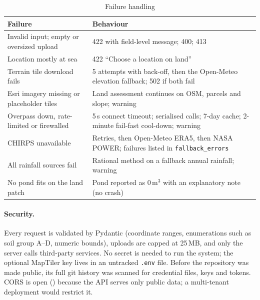 \documentclass[manuscript,screen,review]{acmart}
\newcommand{\code}[1]{\texttt{\small #1}}
\begin{document}
\begin{table}[h]
  \caption{Failure handling}
  \label{tab:failures}
  \small
  \begin{tabularx}{\linewidth}{@{}P{3.6cm}Y@{}}
    \toprule
    Failure & Behaviour \\
    \midrule
    Invalid input; empty or oversized upload & 422 with field-level message; 400; 413 \\
    Location mostly at sea & 422 ``Choose a location on land'' \\
    Terrain tile download fails & 5 attempts with back-off, then the Open-Meteo elevation fallback; 502 if both fail \\
    Esri imagery missing or placeholder tiles & Land assessment continues on OSM, parcels and slope; warning \\
    Overpass down, rate-limited or firewalled & 5\,s connect timeout; serialised calls; 7-day cache; 2-minute fail-fast cool-down; warning \\
    CHIRPS unavailable & Retries, then Open-Meteo ERA5, then NASA POWER; failures listed in \code{fallback\_errors} \\
    All rainfall sources fail & Rational method on a fallback annual rainfall; warning \\
    No pond fits on the land patch & Pond reported as 0\,m$^3$ with an explanatory note (no crash) \\
    \bottomrule
  \end{tabularx}
\end{table}

\paragraph{Security.} Every request is validated by Pydantic (coordinate ranges, enumerations
such as soil group A--D, numeric bounds), uploads are capped at 25\,MB, and only the server
calls third-party services. No secret is needed to run the system; the optional MapTiler key
lives in an untracked \code{.env} file. Before the repository was made public, its full git
history was scanned for credential files, keys and tokens. CORS is open (\code{*}) because the
API serves only public data; a multi-tenant deployment would restrict it.
\end{document}

